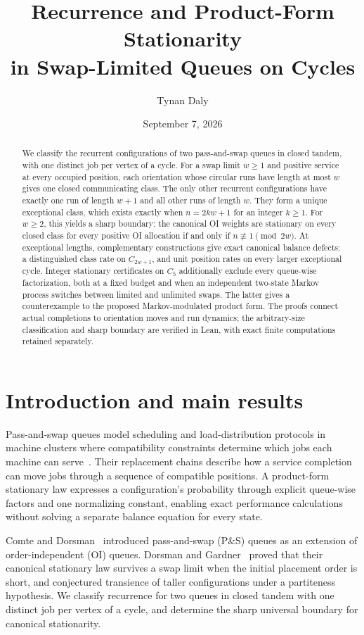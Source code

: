 \documentclass[11pt]{article}
\title{Recurrence and Product-Form Stationarity\\in Swap-Limited Queues on Cycles}
\author{Tynan Daly}
\date{September 7, 2026}
\theoremstyle{remark}
\begin{document}
\maketitle
\begin{abstract}
We classify the recurrent configurations of two pass-and-swap queues in closed tandem, with one distinct job per vertex of a cycle. For a swap limit $w\ge1$ and positive service at every occupied position, each orientation whose circular runs have length at most $w$ gives one closed communicating class. The only other recurrent configurations have exactly one run of length $w+1$ and all other runs of length $w$. They form a unique exceptional class, which exists exactly when $n=2kw+1$ for an integer $k\ge1$. For $w\ge2$, this yields a sharp boundary: the canonical OI weights are stationary on every closed class for every positive OI allocation if and only if $n\not\equiv1\pmod{2w}$. At exceptional lengths, complementary constructions give exact canonical balance defects: a distinguished class rate on $C_{2w+1}$, and unit position rates on every larger exceptional cycle. Integer stationary certificates on $C_5$ additionally exclude every queue-wise factorization, both at a fixed budget and when an independent two-state Markov process switches between limited and unlimited swaps. The latter gives a counterexample to the proposed Markov-modulated product form. The proofs connect actual completions to orientation moves and run dynamics; the arbitrary-size classification and sharp boundary are verified in Lean, with exact finite computations retained separately.
\end{abstract}

\section{Introduction and main results}\label{sec:intro}
Pass-and-swap queues model scheduling and load-distribution protocols in machine clusters where compatibility constraints determine which jobs each machine can serve~\cite[pp.~277--278]{CD}. Their replacement chains describe how a service completion can move jobs through a sequence of compatible positions. A product-form stationary law expresses a configuration's probability through explicit queue-wise factors and one normalizing constant, enabling exact performance calculations without solving a separate balance equation for every state.

Comte and Dorsman~\cite{CD} introduced pass-and-swap (P\&S) queues as an extension of order-independent (OI) queues. Dorsman and Gardner~\cite{DG} proved that their canonical stationary law survives a swap limit when the initial placement order is short, and conjectured transience of taller configurations under a partiteness hypothesis. We classify recurrence for two queues in closed tandem with one distinct job per vertex of a cycle, and determine the sharp universal boundary for canonical stationarity.
\end{document}
